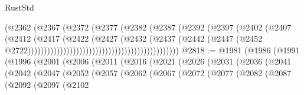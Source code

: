 \begin{lexlean}{RustStd}
\begin{coremodule}
{\begin{coremodule}
{{{{{{{{{{{{{{{{{{{{{{{{{{{{{{{{{{{{{{{{{{{{{                                                            (@2362
                                                              (@2367
                                                                (@2372
                                                                  (@2377
                                                                    (@2382
                                                                      (@2387
                                                                        (@2392
                                                                          (@2397
                                                                            (@2402
                                                                              (@2407
                                                                                (@2412
                                                                                  (@2417
                                                                                    (@2422
                                                                                      (@2427
                                                                                        (@2432
                                                                                          (@2437
                                                                                            (@2442
                                                                                              (@2447
                                                                                                (@2452
                                                                                                  @2722)))))))))))))))))))))))))))))))))))))))))))))))
@2818 := @1981
    (@1986
      (@1991
        (@1996
          (@2001
            (@2006
              (@2011
                (@2016
                  (@2021
                    (@2026
                      (@2031
                        (@2036
                          (@2041
                            (@2042
                              (@2047
                                (@2052
                                  (@2057
                                    (@2062
                                      (@2067
                                        (@2072
                                          (@2077
                                            (@2082
                                              (@2087
                                                (@2092
                                                  (@2097
                                                    (@2102
}}}}}}}}}}}}}}}}}}}}}}}}}}}}}}}}}}}}}}}}}}}}}
\end{coremodule}}
\end{coremodule}
\end{lexlean}
